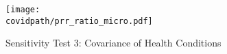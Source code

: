 \documentclass[10pt,letterpaper]{article}
\numberwithin{equation}{section}
\begin{document}
\begin{figure}[H]
  \begin{center}
    \caption{Sensitivity Test 3: Covariance of Health Conditions}
    \label{fig:covar}    
    \texttt{[image: \\covidpath/prr\_ratio\_micro.pdf]}
    
    \footnotesize{}
  \end{center}
\end{figure}


\clearpage



\end{document}
